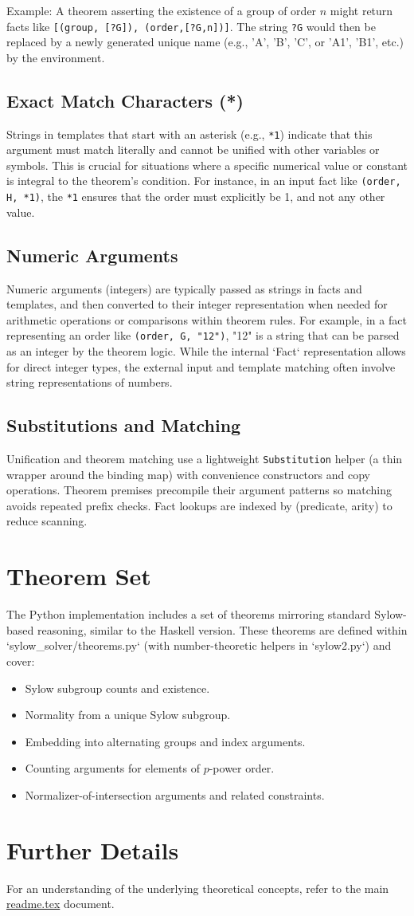 \documentclass[11pt,oneside]{article}
\begin{document}
Example: A theorem asserting the existence of a group of order $n$ might return facts like \texttt{[(group, [?G]), (order,[?G,n])]}. The string \texttt{?G} would then be replaced by a newly generated unique name (e.g., 'A', 'B', 'C', or 'A1', 'B1', etc.) by the environment.

\subsection{Exact Match Characters (*)}
Strings in templates that start with an asterisk (e.g., \texttt{*1}) indicate that this argument must match literally and cannot be unified with other variables or symbols. This is crucial for situations where a specific numerical value or constant is integral to the theorem's condition. For instance, in an input fact like \texttt{(order, H, *1)}, the \texttt{*1} ensures that the order must explicitly be 1, and not any other value.

\subsection{Numeric Arguments}
Numeric arguments (integers) are typically passed as strings in facts and templates, and then converted to their integer representation when needed for arithmetic operations or comparisons within theorem rules. For example, in a fact representing an order like \texttt{(order, G, "12")}, "12" is a string that can be parsed as an integer by the theorem logic. While the internal `Fact` representation allows for direct integer types, the external input and template matching often involve string representations of numbers.

\subsection{Substitutions and Matching}
Unification and theorem matching use a lightweight \texttt{Substitution} helper (a thin wrapper around the binding map) with convenience constructors and copy operations. Theorem premises precompile their argument patterns so matching avoids repeated prefix checks. Fact lookups are indexed by (predicate, arity) to reduce scanning.

\section{Theorem Set}
The Python implementation includes a set of theorems mirroring standard Sylow-based reasoning, similar to the Haskell version. These theorems are defined within `sylow\_solver/theorems.py` (with number-theoretic helpers in `sylow2.py`) and cover:
\begin{itemize}
\item Sylow subgroup counts and existence.
\item Normality from a unique Sylow subgroup.
\item Embedding into alternating groups and index arguments.
\item Counting arguments for elements of $p$-power order.
\item Normalizer-of-intersection arguments and related constraints.
\end{itemize}

\section{Further Details}
For an understanding of the underlying theoretical concepts, refer to the main \href{readme.tex}{readme.tex} document.
\end{document}
